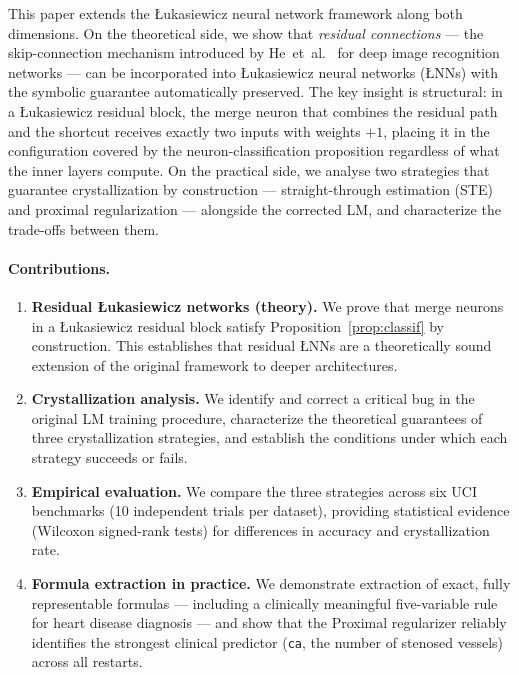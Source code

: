 \documentclass[10pt,a4paper,twoside]{article}
\newcommand{\LNN}{\L{}NN}
\begin{document}
This paper extends the \L{}ukasiewicz neural network framework along both
dimensions.
On the theoretical side, we show that \emph{residual connections}
--- the skip-connection mechanism introduced by He~et~al.~\cite{he2016} for
deep image recognition networks --- can be incorporated into \L{}ukasiewicz
neural networks (\LNN{}s) with the symbolic guarantee automatically preserved.
The key insight is structural: in a \L{}ukasiewicz residual block, the merge
neuron that combines the residual path and the shortcut receives exactly two
inputs with weights $+1$, placing it in the configuration covered by the
neuron-classification proposition regardless of what the inner layers compute.
On the practical side, we analyse two strategies that guarantee crystallization
by construction --- straight-through estimation (STE)~\cite{bengio2013} and
proximal regularization --- alongside the corrected LM, and characterize the
trade-offs between them.

\paragraph{Contributions.}
\begin{enumerate}
  \item \textbf{Residual \L{}ukasiewicz networks (theory).}
    We prove that merge neurons in a \L{}ukasiewicz residual block satisfy
    Proposition~\ref{prop:classif} by construction.
    This establishes that residual \LNN{}s are a theoretically sound extension
    of the original framework to deeper architectures.
  \item \textbf{Crystallization analysis.}
    We identify and correct a critical bug in the original LM training procedure,
    characterize the theoretical guarantees of three crystallization strategies,
    and establish the conditions under which each strategy succeeds or fails.
  \item \textbf{Empirical evaluation.}
    We compare the three strategies across six UCI benchmarks (10 independent
    trials per dataset), providing statistical evidence (Wilcoxon signed-rank
    tests) for differences in accuracy and crystallization rate.
  \item \textbf{Formula extraction in practice.}
    We demonstrate extraction of exact, fully representable formulas ---
    including a clinically meaningful five-variable rule for heart disease
    diagnosis --- and show that the Proximal regularizer reliably identifies
    the strongest clinical predictor (\texttt{ca}, the number of stenosed
    vessels) across all restarts.
\end{enumerate}
\end{document}
